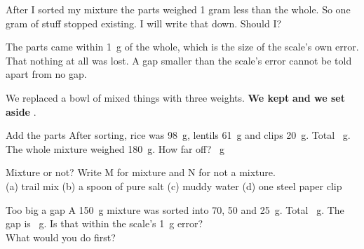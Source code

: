 \begin{center}
\end{center}

\begin{multix}[hmm]\multixbot[hmm]\tcblower
After I sorted my mixture the parts weighed 1 gram less than the whole. So one gram of stuff stopped existing. I will write that down. Should I?
\end{multix}

{The parts came within 1~g of the whole, which is the size of the scale's own error.}
{That nothing at all was lost. A gap smaller than the scale's error cannot be told apart from no gap.}

\begin{keepbox}
We replaced a bowl of mixed things with three weights. \textbf{We kept} \wline[3.4cm] \textbf{and we set aside} \wline[3.4cm].
\end{keepbox}

\clearpage

\begin{puzzle}{Add the parts}
After sorting, rice was 98~g, lentils 61~g and clips 20~g. Total \wline[1.6cm]~g. The whole mixture weighed 180~g. How far off? \wline[1.6cm]~g
\end{puzzle}

\begin{puzzle}{Mixture or not?}
Write M for mixture and N for not a mixture.\\
(a) trail mix \wline[1cm] \quad (b) a spoon of pure salt \wline[1cm] \quad (c) muddy water \wline[1cm] \quad (d) one steel paper clip \wline[1cm]
\end{puzzle}

\begin{puzzle}{Too big a gap}
A 150~g mixture was sorted into 70, 50 and 25~g. Total \wline[1.6cm]~g. The gap is \wline[1.6cm]~g. Is that within the scale's 1~g error? \wline[2cm]\\
What would you do first? \wline[4cm]
\end{puzzle}

